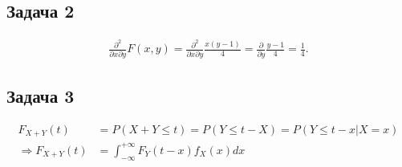 \documentclass[a4paper,11pt]{article}
\begin{document}
\subsection{Задача 2}

\begin{align*}
\frac{\partial^2}{\partial x \partial y}F(x,y) 
= \frac{\partial^2}{\partial x \partial y}\frac{x(y-1)}{4}
= \frac{\partial}{\partial y}\frac{y-1}{4} = \frac{1}{4}.
\end{align*}

\subsection{Задача 3}

\begin{align*}
F_{X+Y}(t) & = P(X+Y \leq t) = P(Y \leq t - X)  = P(Y \leq t - x | X = x) \\
\Rightarrow 
F_{X+Y}(t) & = \int_{-\infty}^{+\infty} F_Y(t-x)f_X(x)dx
\end{align*}
\end{document}
